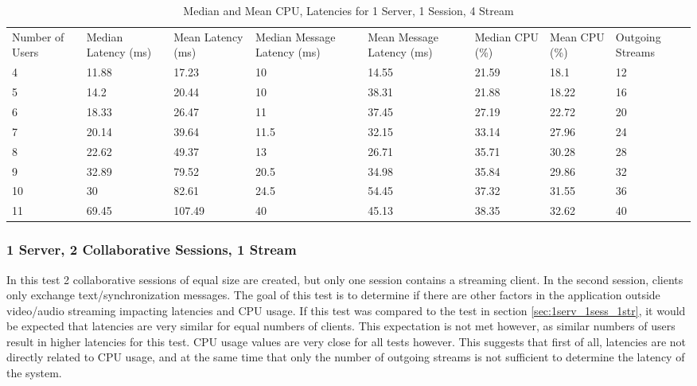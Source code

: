 \begin{table}
\caption{Median and Mean CPU, Latencies for 1 Server, 1 Session, 4 Stream}
\label{table:1serv_1sess_4str}
\begin{tabu} to\linewidth{|X[c]|X[c]|X[c]|X[c]|X[c]|X[c]|X[c]|X[c]|}
\everyrow{\hline}
\hline
Number of Users & Median Latency (ms) & Mean Latency (ms) & Median Message Latency (ms) & Mean Message Latency (ms) & Median CPU (\%) & Mean CPU (\%) & Outgoing Streams\\
4 & 11.88 & 17.23 & 10 & 14.55 & 21.59 & 18.1 & 12 \\
5 & 14.2 & 20.44 & 10 & 38.31 & 21.88 & 18.22 & 16 \\
6 & 18.33 & 26.47 & 11 & 37.45 & 27.19 & 22.72 & 20 \\
7 & 20.14 & 39.64 & 11.5 & 32.15 & 33.14 & 27.96 & 24 \\
8 & 22.62 & 49.37 & 13 & 26.71 & 35.71 & 30.28 & 28 \\
9 & 32.89 & 79.52 & 20.5 & 34.98 & 35.84 & 29.86 & 32 \\
10 & 30 & 82.61 & 24.5 & 54.45 & 37.32 & 31.55 & 36 \\
11 & 69.45 & 107.49 & 40 & 45.13 & 38.35 & 32.62 & 40 \\
\end{tabu}
\end{table}

\subsubsection{1 Server, 2 Collaborative Sessions, 1 Stream}
\label{sec:1serv_2sess_1str180}

In this test 2 collaborative sessions of equal size are created, but only one session contains a streaming client. In the second session, clients only exchange text/synchronization messages. The goal of this test is to determine if there are other factors in the application outside video/audio streaming impacting latencies and CPU usage. If this test was compared to the test in section \ref{sec:1serv_1sess_1str}, it would be expected that latencies are very similar for equal numbers of clients. This expectation is not met however, as similar numbers of users result in higher latencies for this test. CPU usage values are very close for all tests however. This suggests that first of all, latencies are not directly related to CPU usage, and at the same time that only the number of outgoing streams is not sufficient to determine the latency of the system.


